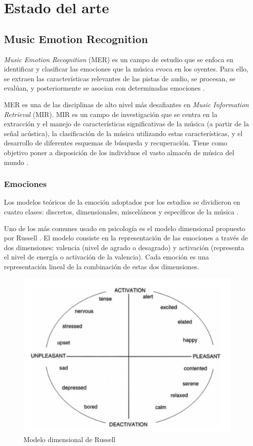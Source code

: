 \documentclass[12pt,a4paper]{article}
\begin{document}
\newpage
\section{Estado del arte}
\subsection{Music Emotion Recognition}

\textit{Music Emotion Recognition} (MER) es un campo de estudio que se enfoca en identificar y clasificar las emociones que la música evoca en los oyentes. Para ello, se extraen las características relevantes de las pistas de audio, se procesan, se evalúan, y posteriormente se asocian con determinadas emociones \cite{GomezCanon2021SPM}.


MER es una de las disciplinas de alto nivel más desafiantes en \textit{Music Information Retrieval} (MIR). MIR es un campo de investigación que se centra en la extracción y el manejo de características significativas de la música (a partir de la señal acústica), la clasificación de la música utilizando estas características, y el desarrollo de diferentes esquemas de búsqueda y recuperación. Tiene como objetivo poner a disposición de los individuos el vasto almacén de música del mundo \cite{schedl2014music}.

\subsubsection{Emociones}\label{emo}

Los modelos teóricos de la emoción adoptados por los estudios se dividieron en cuatro clases: discretos, dimensionales, misceláneos y específicos de la música \cite{eerola2012review}. 


Uno de los más comunes usado en psicología es el modelo dimensional propuesto por Russell \cite{posner2005circumplex}. El modelo consiste en la representación de las emociones a través de dos dimensiones: valencia (nivel de agrado o desagrado) y activación (representa el nivel de energía o activación de la valencia). Cada emoción es una representación lineal de la combinación de estas dos dimensiones.

\begin{figure}[H]
	\centering
	\includegraphics[width=0.7\linewidth]{figs/russell}
	\caption{Modelo dimensional de Russell \cite{posner2005circumplex}}
	\label{fig:russell}
\end{figure}
\end{document}
